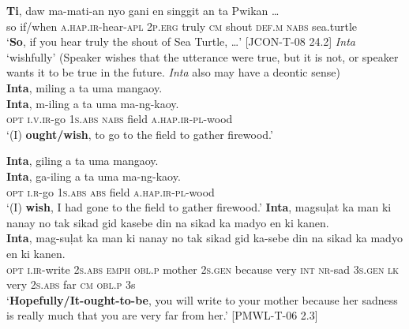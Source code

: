 \gll \textbf{Ti},  daw  ma-mati-an  nyo  gani  en  singgit  an  ta  Pwikan … \\
so  if/when  \textsc{a.}\textsc{hap}\textsc{.ir}-hear-\textsc{apl}  2\textsc{p.erg}  truly  \textsc{cm}  shout  \textsc{def.m}  \textsc{nabs}  sea.turtle \\
\glt ‘\textbf{So}, if you hear truly the shout of Sea Turtle, …' [JCON-T-08 24.2]
\z
\ea
\textit{Inta} ‘wishfully’ (Speaker wishes that the utterance were true, but it is not, or speaker wants it to be true in the future. \textit{Inta} also may have a deontic sense) \\
\textbf{Inta},  miling  a  ta  uma  mangaoy. \\\smallskip
 \gll \textbf{Inta},  m-iling  a  ta  uma  ma-ng-kaoy. \\
\textsc{opt}  \textsc{i.v.ir}-go  1\textsc{s.abs}  \textsc{nabs}  field  \textsc{a.}\textsc{hap}\textsc{.ir}-\textsc{pl}-wood \\
\glt ‘(I) \textbf{ought/wish}, to go to the field to gather firewood.’
\z


\ea
\textbf{Inta},  giling  a  ta  uma  mangaoy. \\\smallskip
 \gll \textbf{Inta},  ga-iling  a  ta  uma  ma-ng-kaoy. \\
\textsc{opt}  \textsc{i.r}-go  1\textsc{s.abs}  \textsc{abs}  field  \textsc{a.hap.ir}-\textsc{pl}-wood \\
\glt ‘(I) \textbf{wish}, I had gone to the field to gather firewood.’
\z
\ea
\textbf{Inta},  magsuļat  ka  man  ki  nanay  no  tak  sikad gid  kasebe  din  na  sikad  ka  madyo  en  ki  kanen. \\\smallskip
 \gll \textbf{Inta},  mag-suļat  ka  man  ki  nanay  no  tak  sikad gid  ka-sebe  din  na  sikad  ka  madyo  en  ki  kanen. \\
\textsc{opt}  \textsc{i.ir}-write  2\textsc{s.abs}  \textsc{emph}  \textsc{obl.p}  mother  2\textsc{s.gen}  because  very
\textsc{int}  \textsc{nr}-sad  3\textsc{s.gen}  \textsc{lk}  very  2\textsc{s.abs}  far  \textsc{cm}  \textsc{obl.p}  3s \\
\glt ‘\textbf{Hopefully/It-ought-to-be}, you will write to your mother because her sadness is really much that you are very far from her.’ [PMWL-T-06 2.3]
\z


